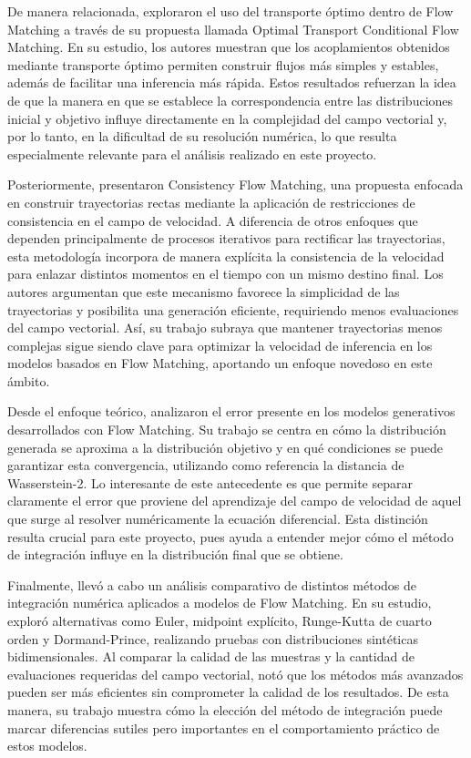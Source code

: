 \documentclass[final,5p,times,twocolumn,authoryear]{elsarticle}
\begin{document}
De manera relacionada, \citet{tong2023improving}  exploraron el uso del transporte óptimo dentro de Flow Matching a través de su propuesta llamada Optimal Transport Conditional Flow Matching. En su estudio, los autores muestran que los acoplamientos obtenidos mediante transporte óptimo permiten construir flujos más simples y estables, además de facilitar una inferencia más rápida. Estos resultados refuerzan la idea de que la manera en que se establece la correspondencia entre las distribuciones inicial y objetivo influye directamente en la complejidad del campo vectorial y, por lo tanto, en la dificultad de su resolución numérica, lo que resulta especialmente relevante para el análisis realizado en este proyecto.

Posteriormente, \citet{yang2024consistency}  presentaron Consistency Flow Matching, una propuesta enfocada en construir trayectorias rectas mediante la aplicación de restricciones de consistencia en el campo de velocidad. A diferencia de otros enfoques que dependen principalmente de procesos iterativos para rectificar las trayectorias, esta metodología incorpora de manera explícita la consistencia de la velocidad para enlazar distintos momentos en el tiempo con un mismo destino final. Los autores argumentan que este mecanismo favorece la simplicidad de las trayectorias y posibilita una generación eficiente, requiriendo menos evaluaciones del campo vectorial. Así, su trabajo subraya que mantener trayectorias menos complejas sigue siendo clave para optimizar la velocidad de inferencia en los modelos basados en Flow Matching, aportando un enfoque novedoso en este ámbito.

Desde el enfoque teórico, \citet{zhou2025error}  analizaron el error presente en los modelos generativos desarrollados con Flow Matching. Su trabajo se centra en cómo la distribución generada se aproxima a la distribución objetivo y en qué condiciones se puede garantizar esta convergencia, utilizando como referencia la distancia de Wasserstein-2. Lo interesante de este antecedente es que permite separar claramente el error que proviene del aprendizaje del campo de velocidad de aquel que surge al resolver numéricamente la ecuación diferencial. Esta distinción resulta crucial para este proyecto, pues ayuda a entender mejor cómo el método de integración influye en la distribución final que se obtiene.

Finalmente, \citet{xiao2026solvers}  llevó a cabo un análisis comparativo de distintos métodos de integración numérica aplicados a modelos de Flow Matching. En su estudio, exploró alternativas como Euler, midpoint explícito, Runge-Kutta de cuarto orden y Dormand-Prince, realizando pruebas con distribuciones sintéticas bidimensionales. Al comparar la calidad de las muestras y la cantidad de evaluaciones requeridas del campo vectorial, notó que los métodos más avanzados pueden ser más eficientes sin comprometer la calidad de los resultados. De esta manera, su trabajo muestra cómo la elección del método de integración puede marcar diferencias sutiles pero importantes en el comportamiento práctico de estos modelos.
\end{document}

